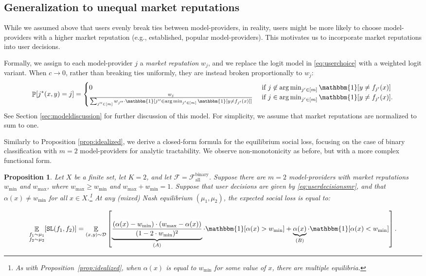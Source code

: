 \documentclass[letterpaper,11pt]{article}
\newtheorem{proposition}{Proposition}
\theoremstyle{plain}
\DeclareMathOperator*{\argmin}{arg\,min}
\DeclareMathOperator*{\E}{\mathbb{E}}
\DeclareMathOperator*{\Prob}{\mathbb{P}}
\begin{document}
\subsection{Generalization to unequal market reputations}\label{subsec:unequal}
While we assumed above that users evenly break ties between model-providers, in reality, users might be more likely to choose model-providers with a higher market reputation (e.g., established, popular model-providers). This motivates us to incorporate market reputations into user decisions. 

Formally, we assign to each model-provider $j$ a \textit{market reputation} $w_j$, and we replace the logit model in \eqref{eq:userchoice} with a {weighted} logit variant. 
When $c\to 0$, rather than breaking ties uniformly, they are instead broken proportionally to $w_j$: 
\begin{equation}
    \label{eq:userdecisionsmr}
    \Prob[j^*(x,y) = j] = 
\begin{cases}
0 & \text{ if } j \not\in \argmin_{j' \in [m]} \mathbbm{1}[y \neq f_{j'}(x)] \\
\frac{w_j}{\sum_{j'' \in [m]} w_{j''} \cdot \mathbbm{1}[j'' \in \argmin_{j' \in [m]} \mathbbm{1}[y \neq f_{j'}(x)]]}
& \text{ if } j \in \argmin_{j' \in [m]} \mathbbm{1}[y \neq f_{j'}(x)].
\end{cases}
\end{equation} 
See Section \ref{sec:modeldiscussion} for further discussion of this model. For simplicity, we assume that market reputations are normalized to sum to one. 

Similarly to Proposition \ref{prop:idealized}, we derive a closed-form formula for the equilibrium social loss, focusing on the case of binary classification with $m = 2$ model-providers for analytic tractability. We observe non-monotonicity as before, but with a more complex functional form. 
\begin{proposition}
\label{prop:2model-providers}
Let $X$ be a finite set, let $K = 2$, and let $\mathcal{F} = \mathcal{F}^{\text{binary}}_{\text{all}}$. Suppose there are $m=2$ model-providers with market reputations $w_{\text{min}}$ and $w_{\text{max}}$, where $w_{\text{max}} \ge w_{\text{min}}$ and $w_{\text{max}} +  w_{\text{min}} = 1$. Suppose that user decisions are given by \eqref{eq:userdecisionsmr}, and that $\alpha(x) \neq w_{\text{min}}$ for all $x \in X$.\footnote{As with Proposition~\ref{prop:idealized}, when $\alpha(x)$ is equal to $w_{\text{min}}$ for some value of $x$, there are multiple equilibria.} At any (mixed) Nash equilibrium $(\mu_1, \mu_2)$, the expected social loss  is equal to: 

\begin{equation}
\label{eq:2model-providerssocialloss} 
\E_{\substack{f_1 \sim \mu_1 \\ f_2 \sim \mu_2}}[\texttt{SL}(f_1, f_2)] = \E_{(x, y) \sim \mathcal{D}} \left[\underbrace{\frac{(\alpha(x) - w_{\text{min}}) \cdot (w_{\text{max}}  - \alpha(x))}{(1 - 2 \cdot w_{\text{min}})^2}}_{(A)} \cdot \mathbbm{1}[\alpha(x) > w_{\text{min}} ]  + \underbrace{\alpha(x)}_{(B)} \cdot \mathbbm{1}[\alpha(x) < w_{\text{min}} ]  \right]. 
\end{equation}
\end{proposition}
\end{document}
